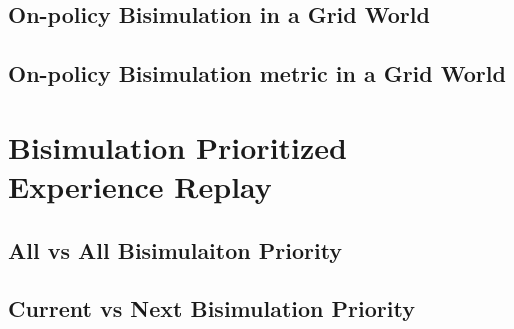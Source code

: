 \subsection{On-policy Bisimulation in a Grid World}

\subsection{On-policy Bisimulation metric in a Grid World}


\section{Bisimulation Prioritized Experience Replay}

\subsection{All vs All Bisimulaiton Priority}
\subsection{Current vs Next Bisimulation Priority}



